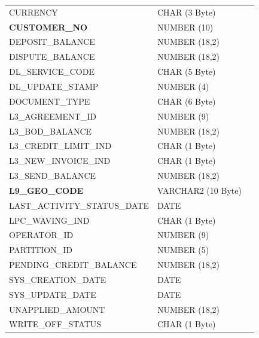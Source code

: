 \documentclass[12pt,twoside]{article}
\begin{document}
\begin{center}
\begin{tabular}{lll}
 CURRENCY                         &  CHAR (3 Byte)       &                        \\
 \textbf{CUSTOMER\_NO}            &  NUMBER (10)         &                        \\
 DEPOSIT\_BALANCE                 &  NUMBER (18,2)       &                        \\
 DISPUTE\_BALANCE                 &  NUMBER (18,2)       &                        \\
 DL\_SERVICE\_CODE                &  CHAR (5 Byte)       &                        \\
 DL\_UPDATE\_STAMP                &  NUMBER (4)          &                        \\
 DOCUMENT\_TYPE                   &  CHAR (6 Byte)       &                        \\
 L3\_AGREEMENT\_ID                &  NUMBER (9)          &                        \\
 L3\_BOD\_BALANCE                 &  NUMBER (18,2)       &                        \\
 L3\_CREDIT\_LIMIT\_IND           &  CHAR (1 Byte)       &                        \\
 L3\_NEW\_INVOICE\_IND            &  CHAR (1 Byte)       &                        \\
 L3\_SEND\_BALANCE                &  NUMBER (18,2)       &                        \\
 \textbf{L9\_GEO\_CODE}           &  VARCHAR2 (10 Byte)  &                        \\
 LAST\_ACTIVITY\_STATUS\_DATE     &  DATE                &                        \\
 LPC\_WAVING\_IND                 &  CHAR (1 Byte)       &                        \\
 OPERATOR\_ID                     &  NUMBER (9)          &                        \\
 PARTITION\_ID                    &  NUMBER (5)          &                        \\
 PENDING\_CREDIT\_BALANCE         &  NUMBER (18,2)       &                        \\
 SYS\_CREATION\_DATE              &  DATE                &                        \\
 SYS\_UPDATE\_DATE                &  DATE                &                        \\
 UNAPPLIED\_AMOUNT                &  NUMBER (18,2)       &                        \\
 WRITE\_OFF\_STATUS               &  CHAR (1 Byte)       &                        \\
\hline
\end{tabular}
\end{center}
\end{document}
